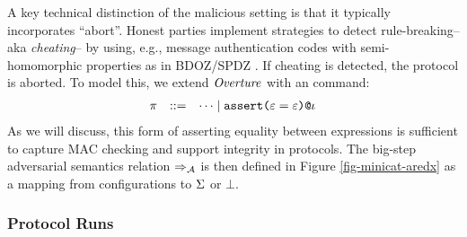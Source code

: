 A key technical distinction of the malicious setting is that it
typically incorporates ``abort''. Honest parties implement strategies
to detect rule-breaking-- aka \emph{cheating}-- by using, e.g.,
message authentication codes with semi-homomorphic properties as in
BDOZ/SPDZ \cite{10.1007/978-3-030-68869-1_3}. If cheating is detected,
the protocol is aborted. To model this, we extend $\mathit{Overture}$ with an
 command:
$$
    \begin{array}{rcl@{\hspace{2mm}}r}
      \prog &::=& \cdots \mid \elab{\assert{\be = \be}}{\cid}
    \end{array}
$$
As we will discuss, this form of asserting equality between expressions
is sufficient to capture MAC checking and support integrity in protocols.
The big-step adversarial semantics relation $\Rightarrow_{\mathcal{A}}$ is then defined
in Figure \ref{fig-minicat-aredx} as a mapping from configurations to
$\Sigma$ or $\bot$.

\subsubsection{Protocol Runs}


